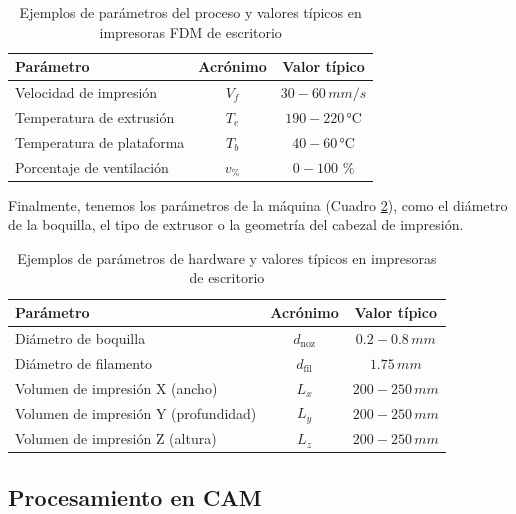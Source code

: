 \begin{table}[ht]
  \centering
  \caption{Ejemplos de parámetros del proceso y valores típicos en impresoras FDM de escritorio}
  \label{tab:param-proceso}
  \begin{tabular}{@{} l c c @{}}
    \toprule
    Parámetro                         & Acrónimo  & Valor típico  \\
    \midrule
    Velocidad de impresión            & $V_{f}$ &    $\mathrm{30-60}\,mm/s$  \\
    Temperatura de extrusión          & $T_{e}$  &    $\mathrm{190-220}\, \si{\celsius}$\\
    Temperatura de plataforma         & $T_{b}$   & $\mathrm{40-60}\, \si{\celsius}$ \\
    Porcentaje de ventilación         & $v_{\%}$ & $\mathrm{0-100}$ $\%$\\
    \bottomrule
  \end{tabular}
\end{table}

Finalmente, tenemos los parámetros de la máquina (Cuadro \ref{tab:param-hardware}), como el diámetro de la boquilla, el tipo de extrusor o la geometría del cabezal de impresión. 

\begin{table}[ht]
  \centering
  \caption{Ejemplos de parámetros de hardware y valores típicos en impresoras de escritorio}
  \label{tab:param-hardware}
  \begin{tabular}{@{} l c c@{}}
    \toprule
    Parámetro                                   & Acrónimo & Valor típico  \\
    \midrule
    Diámetro de boquilla                        & $d_{\mathrm{noz}}$ &  $\mathrm{0.2-0.8}\,mm$ \\
    Diámetro de filamento                       & $d_{\mathrm{fil}}$ & $\mathrm{1.75}\,mm$ \\
    Volumen de impresión X (ancho)              & $L_{x}$   & $\mathrm{200-250}\,mm$\\
    Volumen de impresión Y (profundidad)        & $L_{y}$   & $\mathrm{200-250}\,mm$ \\
    Volumen de impresión Z (altura)             & $L_{z}$   & $\mathrm{200-250}\,mm$ \\
    \bottomrule
  \end{tabular}
\end{table}

\subsection{Procesamiento en CAM}

